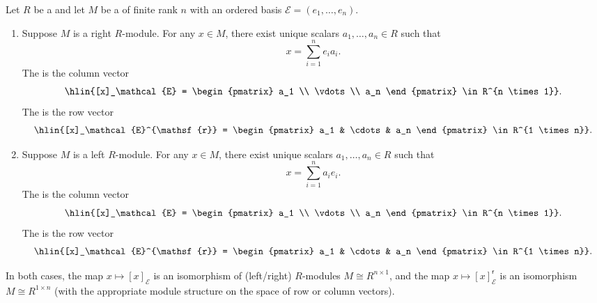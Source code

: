 \begin{definition} \label{definition:coordinate_vector_of_an_element_of_a_free_module_with_respect_to_a_basis}
    Let $R$ be a  and let $M$ be a  of finite rank $n$ with an ordered basis $\mathcal{E} = (e_1,\ldots,e_n)$.

    \begin{enumerate}
        \item Suppose $M$ is a right $R$-module. For any $x \in M$, there exist unique scalars $a_1,\ldots,a_n \in R$ such that
        $$x = \sum_{i=1}^n e_i a_i.$$
        The  is the column vector
        $$\hlin{[x]_\mathcal{E} = \begin{pmatrix} a_1 \\ \vdots \\ a_n \end{pmatrix} \in R^{n \times 1}}.$$
        The  is the row vector
        $$\hlin{[x]_\mathcal{E}^{\mathsf{r}} = \begin{pmatrix} a_1 & \cdots & a_n \end{pmatrix} \in R^{1 \times n}}.$$

        \item Suppose $M$ is a left $R$-module. For any $x \in M$, there exist unique scalars $a_1,\ldots,a_n \in R$ such that
        $$x = \sum_{i=1}^n a_i e_i.$$
        The  is the column vector
        $$\hlin{[x]_\mathcal{E} = \begin{pmatrix} a_1 \\ \vdots \\ a_n \end{pmatrix} \in R^{n \times 1}}.$$
        The  is the row vector
        $$\hlin{[x]_\mathcal{E}^{\mathsf{r}} = \begin{pmatrix} a_1 & \cdots & a_n \end{pmatrix} \in R^{1 \times n}}.$$
    \end{enumerate}

    In both cases, the map $x \mapsto [x]_\mathcal{E}$ is an isomorphism of (left/right) $R$-modules $M \cong R^{n \times 1}$, and the map $x \mapsto [x]_\mathcal{E}^{\mathsf{r}}$ is an isomorphism $M \cong R^{1 \times n}$ (with the appropriate module structure on the space of row or column vectors).
\end{definition}